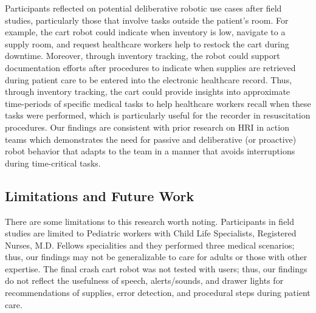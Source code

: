 Participants reflected on potential deliberative robotic use cases after field studies, particularly those that involve tasks outside the patient's room. 
For example, the cart robot could indicate when inventory is low, navigate to a supply room, and request healthcare workers help to restock the cart during downtime. 
Moreover, through inventory tracking, the robot could support documentation efforts after procedures to indicate when supplies are retrieved during patient care to be entered into the electronic healthcare record. 
Thus, through inventory tracking, the cart could provide insights into approximate time-periods of specific medical tasks to help healthcare workers recall when these tasks were performed, which is particularly useful for the recorder in resuscitation procedures. 
Our findings are consistent with prior research on HRI in action teams which demonstrates the need for passive and deliberative (or proactive) robot behavior \cite{jamshad2024taking} that adapts to the team in a manner that avoids interruptions during time-critical tasks.

\subsection{Limitations and Future Work}

There are some limitations to this research worth noting.
Participants in field studies are limited to Pediatric workers with Child Life Specialists, Registered Nurses, M.D. Fellows specialities and they performed three medical scenarios; thus, our findings may not be generalizable to care for adults or those with other expertise.
The final crash cart robot was not tested with users; thus, our findings do not reflect the usefulness of speech, alerts/sounds, and drawer lights for recommendations of supplies, error detection, and procedural steps during patient care.

